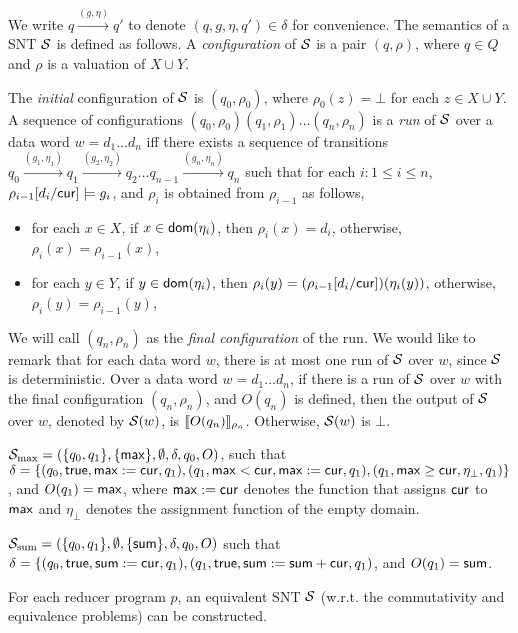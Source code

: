We write $q \xrightarrow{(g,\eta)} q'$ to denote $(q,g,\eta,q') \in \delta$ for convenience. 
The semantics of a SNT ${\mathcal{S} }$  is defined as follows. A \emph{configuration} of ${\mathcal{S} }$ is a pair $(q,\rho)$, where $q \in Q$ and $\rho$ is a valuation of $X \cup Y$. 


The \emph{initial} configuration of ${\mathcal{S} }$ is $(q_0,\rho_0)$, where $\rho_0(z)=\bot$ for each $z \in X\cup Y$.
A sequence of configurations $(q_0,\rho_0)(q_1,\rho_1)\ldots(q_n,\rho_n)$ is
a \emph{run} of ${\mathcal{S} }$ over a data word $w=d_1 \dots d_n$ iff there exists a sequence of transitions $q_0 \xrightarrow{(g_1,\eta_1)} q_1 \xrightarrow{(g_2,\eta_2)} q_2 \dots q_{n-1} \xrightarrow{(g_n, \eta_n)} q_n$ such that for each $i: 1 \le i \le n$, $\rho_{i-1}[d_i/\mathsf{cur}]  \models g_i$, and $\rho_i$ is obtained from $\rho_{i-1}$ as follows,
\begin{itemize}
\item for each $x \in X$, if $ x \in \mathsf{dom}(\eta_i)$, then $\rho_i(x)=d_i$, otherwise, $\rho_i(x)=\rho_{i-1}(x)$,
%
\item for each $y \in Y$, if $y \in \mathsf{dom}(\eta_i)$, then $\rho_i(y)=(\rho_{i-1}[d_i/\mathsf{cur}])(\eta_i(y))$, otherwise, $\rho_i(y)=\rho_{i-1}(y)$,
\end{itemize}
We will call $(q_n,\rho_n)$ as the \emph{final configuration} of the run.
We would like to remark that for each data word $w$, there is at most one run of ${\mathcal{S} }$ over $w$, since ${\mathcal{S} }$ is deterministic. 
Over a data word $w = d_1 \dots d_n$, if there is a run of ${\mathcal{S} }$ over $w$ with the final configuration $(q_n,\rho_n)$, and $O(q_n)$ is defined, then the output of ${\mathcal{S} }$ over $w$, denoted by ${{\mathcal{S} }}(w)$, is $\llbracket O(q_n)\rrbracket_{\rho_n}$. Otherwise, ${{\mathcal{S} }}(w)$ is $\bot$.

\begin{example}
${\mathcal{S} }_{\max}=(\{q_0,q_1\}, \{\mathsf{max}\}, \emptyset, \delta, q_0, O)$, such that $\delta = \{(q_0, \mathsf{true}, \mathsf{max}:=\mathsf{cur}, q_1), (q_1, \mathsf{max} < \mathsf{cur}, \mathsf{max}:=\mathsf{cur},q_1), (q_1, \mathsf{max} \ge \mathsf{cur}, \eta_\bot, q_1)\}$, and $O(q_1)=\mathsf{max}$, where $\mathsf{max}:=\mathsf{cur}$ denotes the function that assigns $\mathsf{cur}$ to $\mathsf{max}$ and $\eta_\bot$ denotes the assignment function of the empty domain.
\end{example}
\begin{example}
${\mathcal{S} }_{\mathrm{sum}}=(\{q_0,q_1\}, \emptyset, \{\mathsf{sum}\}, \delta, q_0, O)$ such that $\delta=\{(q_0, \mathsf{true}, \mathsf{sum}:=\mathsf{cur}, q_1), (q_1, \mathsf{true}, \mathsf{sum}:=\mathsf{sum} + \mathsf{cur}, q_1)$, and $O(q_1)=\mathsf{sum}$. 
\end{example}
\begin{proposition}\label{prop-mrprog-to-snt}
For each reducer program $p$, an equivalent SNT ${\mathcal{S} }$ (w.r.t. the commutativity and equivalence problems) can be constructed.
\end{proposition}

